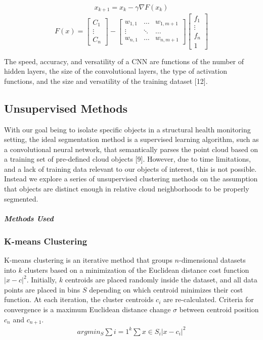 \documentclass[12pt]{drexelthesis}
\begin{document}
\begin{gather*}
	x_{k+1} = x_{k} - \gamma \nabla F(x_{k})
\end{gather*}
 \[ F(x) =
\begin{bmatrix}
C_{1} \\
\vdots \\
C_{n}
\end{bmatrix}  -  \begin{bmatrix} w_{1,1} & \hdots & w_{1,m+1} \\ \vdots & \ddots & \hdots \\ w_{n,1} & \hdots & w_{n, m+1} \end{bmatrix}  \begin{bmatrix} f_{1} \\ \vdots \\ f_{n} \\ 1 \end{bmatrix} \]

The speed, accuracy, and versatility of a CNN are functions of the number of hidden layers, the size of the convolutional layers, the type of activation functions, and the size and versatility of the training dataset [12].

\subsection{Unsupervised Methods}
With our goal being to isolate specific objects in a structural health monitoring setting, the ideal segmentation method is a supervised learning algorithm, such as a convolutional neural network, that semantically parses the point cloud based on a training set of pre-defined cloud objects [9]. However, due to time limitations, and a lack of training data relevant to our objects of interest, this is not possible. Instead we explore a series of unsupervised clustering methods on the assumption that objects are distinct enough in relative cloud neighborhoods to be properly segmented.
\subparagraph{Methods Used}
\subsubsection{K-means Clustering}
K-means clustering is an iterative method that groups $n$-dimensional datasets into $k$ clusters based on a minimization of the Euclidean distance cost function $|x-c|^{2}$. Initially, $k$ centroids are placed randomly inside the dataset, and all data points are placed in bins $S$ depending on which centroid minimizes their cost function. At each iteration, the cluster centroids $c_{i}$ are re-calculated. Criteria for convergence is a maximum Euclidean distance change $σ$ between centroid position $c_{n}$ and $c_{n+1}$.
\begin{gather*}
	arg min_{S} \sum{i=1}^{k} \sum{x \in S_{i}} |x - c_{i}|^{2}
\end{gather*}
\end{document}
